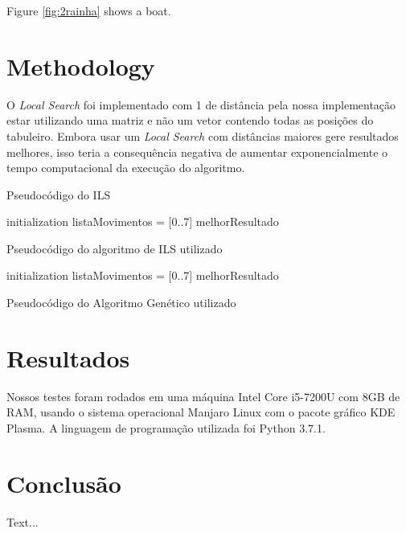 \documentclass[sigconf]{acmart}
\begin{document}
Figure \ref{fig:2rainha} shows a boat.


\section{Methodology}

O \textit{Local Search} foi implementado com 1 de distância pela nossa implementação
estar utilizando uma matriz e não um vetor contendo todas as posições do tabuleiro. Embora usar um
\textit{Local Search} com distâncias maiores gere resultados melhores, isso teria a consequência
negativa de aumentar exponencialmente o tempo computacional da execução do algoritmo.

Pseudocódigo do ILS
\begin{algorithm}
  initialization\;
  listaMovimentos = [0..7]\;
  melhorResultado\;
  \caption{Pseudocódigo do algoritmo de ILS utilizado}
 \end{algorithm}

 \begin{algorithm}
  initialization\;
  listaMovimentos = [0..7]\;
  melhorResultado\;
  \caption{Pseudocódigo do Algoritmo Genético utilizado}
 \end{algorithm}
 

\section{Resultados}

Nossos testes foram rodados em uma máquina Intel Core i5-7200U com 8GB de RAM, usando o sistema operacional 
Manjaro Linux com o pacote gráfico KDE Plasma. A linguagem de programação
utilizada foi Python 3.7.1.

\section{Conclusão}

Text...



\end{document}
